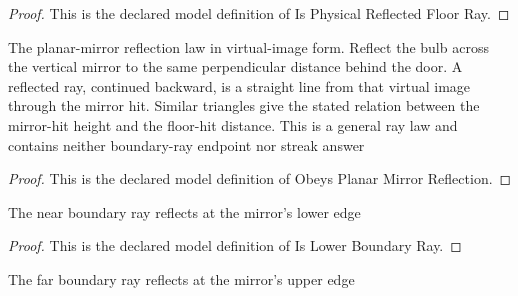 \begin{proof}
  This is the declared model definition of Is Physical Reflected Floor Ray.
\end{proof}
\begin{definition}
  \label{def:physics:phyx-mini-0048:phyxminiproblems-problemphyxmini0048-obeysplanarmirrorreflection}
  The planar-mirror reflection law in virtual-image form. Reflect the bulb across the vertical mirror to the same perpendicular distance behind the door. A reflected ray, continued backward, is a straight line from that virtual image through the mirror hit. Similar triangles give the stated relation between the mirror-hit height and the floor-hit distance. This is a general ray law and contains neither boundary-ray endpoint nor streak answer
\end{definition}
\begin{proof}
  This is the declared model definition of Obeys Planar Mirror Reflection.
\end{proof}
\begin{definition}
  \label{def:physics:phyx-mini-0048:phyxminiproblems-problemphyxmini0048-islowerboundaryray}
  The near boundary ray reflects at the mirror's lower edge
\end{definition}
\begin{proof}
  This is the declared model definition of Is Lower Boundary Ray.
\end{proof}
\begin{definition}
  \label{def:physics:phyx-mini-0048:phyxminiproblems-problemphyxmini0048-isupperboundaryray}
  The far boundary ray reflects at the mirror's upper edge
\end{definition}
